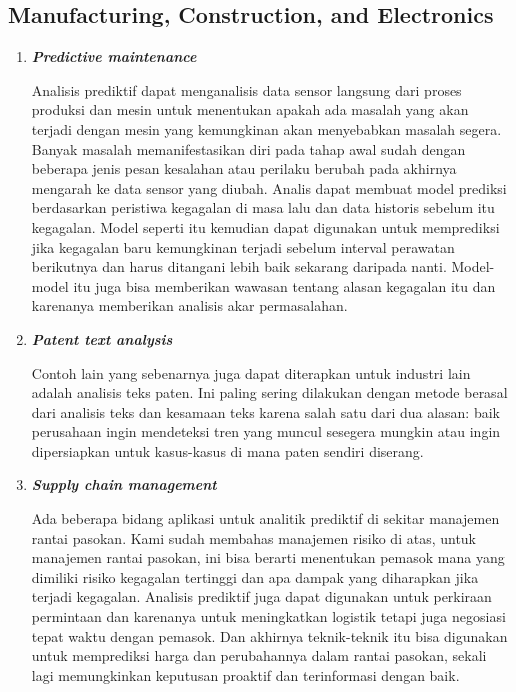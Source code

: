 \subsection{Manufacturing, Construction, and Electronics }
\begin{enumerate}
    \item\textbf{\textit{ Predictive maintenance}}
    
\par Analisis prediktif dapat menganalisis data sensor langsung dari proses produksi dan mesin untuk menentukan apakah ada masalah yang akan terjadi dengan mesin yang kemungkinan akan menyebabkan masalah segera. Banyak masalah memanifestasikan diri pada tahap awal sudah dengan beberapa jenis pesan kesalahan atau perilaku berubah pada akhirnya mengarah ke data sensor yang diubah. Analis dapat membuat model prediksi berdasarkan peristiwa kegagalan di masa lalu dan data historis sebelum itu kegagalan. Model seperti itu kemudian dapat digunakan untuk memprediksi jika kegagalan baru kemungkinan terjadi sebelum interval perawatan berikutnya dan harus ditangani lebih baik sekarang daripada nanti. Model-model itu juga bisa memberikan wawasan tentang alasan kegagalan itu dan karenanya memberikan analisis akar permasalahan.

\item \textit{	\textbf{Patent text analysis}}
\par Contoh lain yang sebenarnya juga dapat diterapkan untuk industri lain adalah analisis teks paten. Ini paling sering dilakukan dengan metode berasal dari analisis teks dan kesamaan teks karena salah satu dari dua alasan: baik perusahaan ingin mendeteksi tren yang muncul sesegera mungkin atau ingin dipersiapkan untuk kasus-kasus di mana paten sendiri diserang.

\item \textit{\textbf{Supply chain management
}}

\par Ada beberapa bidang aplikasi untuk analitik prediktif di sekitar manajemen rantai pasokan. Kami sudah membahas manajemen risiko di atas, untuk manajemen rantai pasokan, ini bisa berarti menentukan pemasok mana yang dimiliki risiko kegagalan tertinggi dan apa dampak yang diharapkan jika terjadi kegagalan. Analisis prediktif juga dapat digunakan untuk perkiraan permintaan dan karenanya untuk meningkatkan logistik tetapi juga negosiasi tepat waktu dengan pemasok. Dan akhirnya teknik-teknik itu bisa digunakan untuk memprediksi harga dan perubahannya dalam rantai pasokan, sekali lagi memungkinkan keputusan proaktif dan terinformasi dengan baik. 


\end{enumerate}
